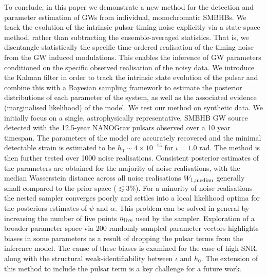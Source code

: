 \documentclass[fleqn,usenatbib,useAMS]{mnras}
\begin{document}
To conclude, in this paper we demonstrate a new method for the detection and parameter estimation of GWs from individual, monochromatic SMBHBs. We track the evolution of the intrinsic pulsar timing noise explicitly via a state-space method, rather than subtracting the ensemble-averaged statistics. That is, we disentangle statistically the specific time-ordered realisation of the timing noise from the GW induced modulations. This enables the inference of GW parameters conditioned on the specific observed realisation of the noisy data. We introduce the Kalman filter in order to track the intrinsic state evolution of the pulsar and combine this with a Bayesian sampling framework to estimate the posterior distributions of each parameter of the system, as well as the associated evidence (marginalised likelihood) of the model. We test our method on synthetic data. We initially focus on a single, astrophysically representative, SMBHB GW source detected with the 12.5-year NANOGrav pulsars observed over a 10 year timespan. The parameters of the model are accurately recovered and the minimal detectable strain is estimated to be $h_0 \sim 4 \times 10^{-15}$ for $\iota=1.0$ rad. The method is then further tested over 1000 noise realisations. Consistent posterior estimates of the parameters are obtained for the majority of noise realisations, with the median Wasserstein distance across all noise realisations $W_{1, \rm median}$ generally small compared to the prior space ($\lesssim 3 \%$). For a minority of noise realisations the nested sampler converges poorly and settles into a local likelihood optima for the posteriors estimates of $\psi$ and $\alpha$. This problem can be solved in general by increasing the number of live points $n_{\rm live}$ used by the sampler. Exploration of a broader parameter space via 200 randomly sampled parameter vectors highlights biases in some parameters as a result of dropping the pulsar terms from the inference model. The cause of these biases is examined for the case of high SNR, along with the structural weak-identifiability between $\iota$ and $h_0$. The extension of this method to include the pulsar term is a key challenge for a future work.
 
 

\appendix
\end{document}
